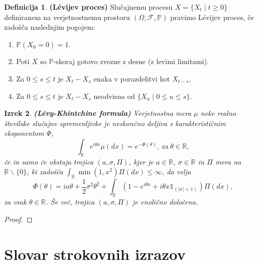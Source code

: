 \documentclass[12pt,a4paper]{amsart}
\theoremstyle{definition} %
\newtheorem{definicija}{Definicija}[section]
\theoremstyle{plain} %
\newtheorem{izrek}[definicija]{Izrek}
\newcommand{\geslo}[2]{\noindent\textbf{#1}\hspace*{3mm}\hangindent=\parindent\hangafter=1 #2}
\begin{document}
    \begin{definicija}
        \textbf{(Lévijev proces)} Slučajnemu procesu $X = \{X_t \mid t \geq 0\}$ definiranem na verjetnostnemu
        prostoru $(\Omega, \mathcal{F}, \mathds{P})$ pravimo Lévijev proces, če zadošča naslednjim pogojem:
        \begin{enumerate}
            \item $\mathds{P}(X_0 = 0)=1$.
            \item Poti $X$ so $\mathds{P}$-skoraj gotovo zvezne z desne (z levimi limitami).
            \item Za $0 \leq s \leq t$ je $X_t - X_s$ enaka v porazdelitvi kot $X_{t-s}$.
            \item Za $0 \leq s \leq t$ je $X_t - X_s$ neodvisna od $\{X_u \mid 0 \leq u \leq s\}$.
        \end{enumerate}
    \end{definicija}

    \begin{izrek}
        \textbf{(Lévy-Khintchine formula)} Verjetnostna mera $\mu$ neke realno številske slučajne spremenljivke 
        je neskončno deljiva s karakterističnim eksponentom $\Phi$,
        $$
        \int_{\mathbb{R}} e^{i\theta x} \mu(dx) = e^{-\Phi(\theta)},\ \text{za} \ \theta \in \mathbb{R},
        $$
        če in samo če obstaja trojica $(a, \sigma, \Pi)$, kjer je $a \in \mathbb{R}$, $\sigma \in 
        \mathbb{R}$ in $\Pi$ mera na $\mathbb{R}\backslash\{0\}$, ki zadošča $\int_{\mathbb{R}}\min(1, x^2)\Pi(dx)\leq \infty$, 
        da velja
        $$
        \Phi(\theta) = i a \theta + \frac{1}{2}\sigma^2\theta^2 + \int_{\mathbb{R}}(1 - e^{i\theta x} + i\theta x \mathds{1}_{(|x|<1)})\Pi(dx),
        $$
        za vsak $\theta \in \mathbb{R}$. Še več, trojica $(a, \sigma, \Pi)$ je enolično določena.
    \end{izrek}

    \begin{proof}
        
    \end{proof}

\section*{Slovar strokovnih izrazov}

%
%


\begin{thebibliography}{99}


\end{thebibliography}
\end{document}
